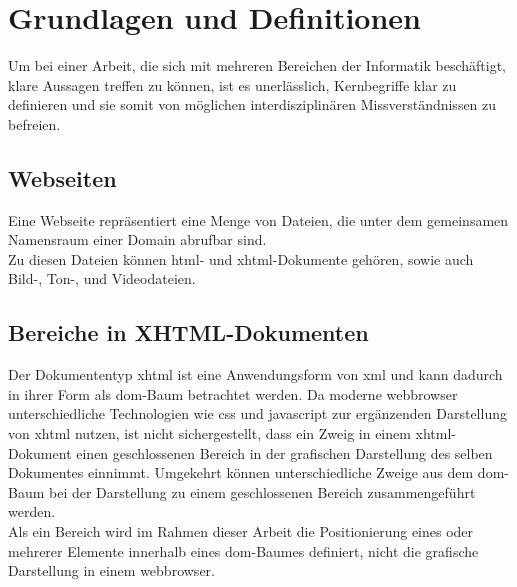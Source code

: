 
\chapter{Grundlagen und Definitionen}
\label{chp:GrundlagenDefinitionen}

Um bei einer Arbeit, die sich mit mehreren Bereichen der Informatik beschäftigt, klare Aussagen treffen zu können, ist es unerlässlich, Kernbegriffe klar zu
definieren und sie somit von möglichen interdisziplinären Missverständnissen zu befreien.

\section{Webseiten}
\label{sec:GrundlagenDefinitionen:Webseiten}
Eine Webseite repräsentiert eine Menge von Dateien, die unter dem gemeinsamen Namensraum einer Domain abrufbar sind.\\
Zu diesen Dateien können \gls{html}- und \gls{xhtml}-Dokumente gehören, sowie auch Bild-, Ton-, und Videodateien.

\section{Bereiche in XHTML-Dokumenten}
\label{sec:GrundlagenDefinitionen:BereicheXHTML}
Der Dokumententyp \gls{xhtml} ist eine Anwendungsform von \gls{xml}\cite{xhtml:w3c} und kann dadurch in ihrer Form als \gls{dom}-Baum betrachtet
werden\cite{xhtml:oreilly}. Da moderne \Gls{webbrowser} unterschiedliche Technologien wie \gls{css} und \gls{javascript} zur ergänzenden Darstellung von
\gls{xhtml} nutzen, ist nicht sichergestellt, dass ein Zweig in einem \gls{xhtml}-Dokument einen geschlossenen Bereich in der grafischen Darstellung des
selben Dokumentes einnimmt. Umgekehrt können unterschiedliche Zweige aus dem \gls{dom}-Baum bei der Darstellung zu einem geschlossenen Bereich zusammengeführt
werden.\\

Als ein Bereich wird im Rahmen dieser Arbeit die Positionierung eines oder mehrerer Elemente innerhalb eines \gls{dom}-Baumes definiert, nicht die grafische
Darstellung in einem \gls{webbrowser}.

